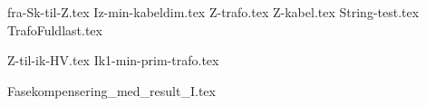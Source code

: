 \usepackage[utf8]{inputenc}%
\usepackage{amsmath}%
\usepackage{mathtools}%
\usepackage{icomma}%
\usepackage{siunitx}%
\usepackage{fp}%
\usepackage{xstring}%
\usepackage{listofitems}
\usepackage{ifthen}


{fra-Sk-til-Z.tex}
{Iz-min-kabeldim.tex}
{Z-trafo.tex}
{Z-kabel.tex}
{String-test.tex}
{TrafoFuldlast.tex}


{Z-til-ik-HV.tex}
{Ik1-min-prim-trafo.tex}

{Fasekompensering_med_result_I.tex}